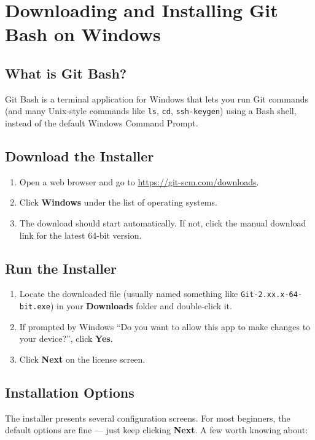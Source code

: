 \documentclass[../main.tex]{subfiles}
\begin{document}
\section{Downloading and Installing Git Bash on Windows}

\subsection{What is Git Bash?}
Git Bash is a terminal application for Windows that lets you run
Git commands (and many Unix-style commands like \texttt{ls}, \texttt{cd},
\texttt{ssh-keygen}) using a Bash shell, instead of the default
Windows Command Prompt.

\subsection{Download the Installer}
\begin{enumerate}[leftmargin=*]
    \item Open a web browser and go to \url{https://git-scm.com/downloads}.
    \item Click \textbf{Windows} under the list of operating systems.
    \item The download should start automatically. If not, click the
    manual download link for the latest 64-bit version.
\end{enumerate}

\subsection{Run the Installer}
\begin{enumerate}[leftmargin=*]
    \item Locate the downloaded file (usually named something like
    \texttt{Git-2.xx.x-64-bit.exe}) in your \textbf{Downloads} folder
    and double-click it.
    \item If prompted by Windows ``Do you want to allow this app to
    make changes to your device?'', click \textbf{Yes}.
    \item Click \textbf{Next} on the license screen.
\end{enumerate}

\subsection{Installation Options}
The installer presents several configuration screens. For most
beginners, the default options are fine — just keep clicking
\textbf{Next}. A few worth knowing about:
\end{document}
